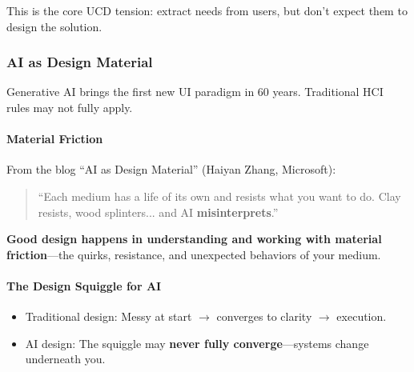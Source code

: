 This is the core UCD tension: extract needs from users, but don't expect them to design the solution.

\subsubsection*{AI as Design Material}

\begin{keybox}
Generative AI brings the first new UI paradigm in 60 years. Traditional HCI rules may not fully apply.
\end{keybox}

\paragraph*{Material Friction}
From the blog ``AI as Design Material'' (Haiyan Zhang, Microsoft):
\begin{quote}
``Each medium has a life of its own and resists what you want to do. Clay resists, wood splinters... and AI \textbf{misinterprets}.''
\end{quote}

\textbf{Good design happens in understanding and working with material friction}---the quirks, resistance, and unexpected behaviors of your medium.

\paragraph*{The Design Squiggle for AI}
\begin{itemize}
  \item Traditional design: Messy at start $\to$ converges to clarity $\to$ execution.
  \item AI design: The squiggle may \textbf{never fully converge}---systems change underneath you.
\end{itemize}

